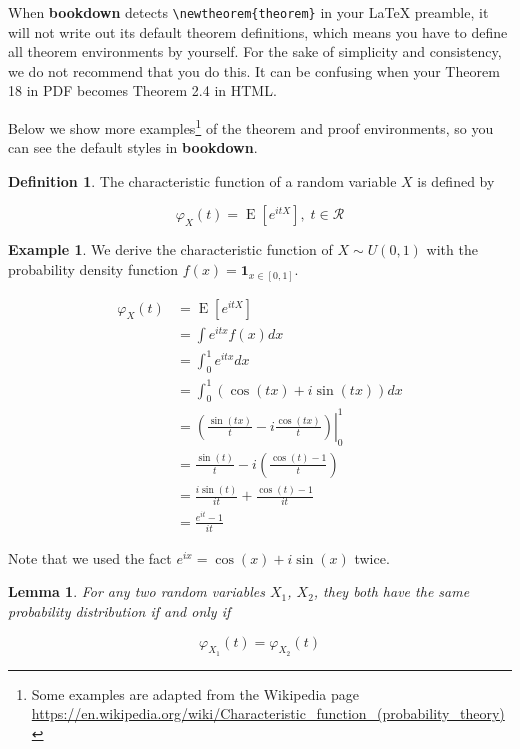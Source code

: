 \documentclass[
  12pt,
]{krantz}
\newtheorem{lemma}{Lemma}[chapter]
\theoremstyle{definition}
\newtheorem{definition}{Definition}[chapter]
\theoremstyle{definition}
\newtheorem{example}{Example}[chapter]
\theoremstyle{definition}
\theoremstyle{definition}
\theoremstyle{remark}
\begin{document}
When \textbf{bookdown} detects \texttt{\textbackslash{}newtheorem\{theorem\}} in your LaTeX preamble, it will not write out its default theorem definitions, which means you have to define all theorem environments by yourself. For the sake of simplicity and consistency, we do not recommend that you do this. It can be confusing when your Theorem 18 in PDF becomes Theorem 2.4 in HTML.

Below we show more examples\footnote{Some examples are adapted from the Wikipedia page \url{https://en.wikipedia.org/wiki/Characteristic_function_(probability_theory)}} of the theorem and proof environments, so you can see the default styles in \textbf{bookdown}.

\begin{definition}
The characteristic function of a random variable \(X\) is defined by

\[\varphi _{X}(t)=\operatorname {E} \left[e^{itX}\right], \; t\in\mathcal{R}\]
\end{definition}

\begin{example}
We derive the characteristic function of \(X\sim U(0,1)\) with the probability density function \(f(x)=\mathbf{1}_{x \in [0,1]}\).

\begin{equation*}
\begin{split}
\varphi _{X}(t) &= \operatorname {E} \left[e^{itX}\right]\\
 & =\int e^{itx}f(x)dx\\
 & =\int_{0}^{1}e^{itx}dx\\
 & =\int_{0}^{1}\left(\cos(tx)+i\sin(tx)\right)dx\\
 & =\left.\left(\frac{\sin(tx)}{t}-i\frac{\cos(tx)}{t}\right)\right|_{0}^{1}\\
 & =\frac{\sin(t)}{t}-i\left(\frac{\cos(t)-1}{t}\right)\\
 & =\frac{i\sin(t)}{it}+\frac{\cos(t)-1}{it}\\
 & =\frac{e^{it}-1}{it}
\end{split}
\end{equation*}

Note that we used the fact \(e^{ix}=\cos(x)+i\sin(x)\) twice.
\end{example}

\begin{lemma}
\protect\hypertarget{lem:chf-pdf}{}\label{lem:chf-pdf}For any two random variables \(X_1\), \(X_2\), they both have the same probability distribution if and only if

\[\varphi _{X_1}(t)=\varphi _{X_2}(t)\]
\end{lemma}
\end{document}
